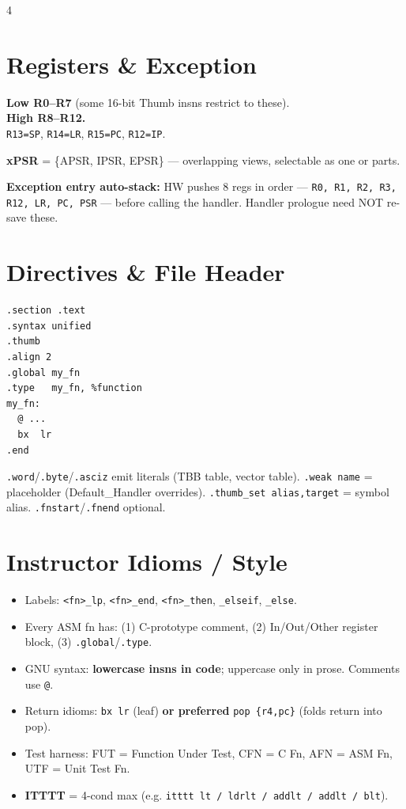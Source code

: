\documentclass[8pt,landscape]{extarticle}
\newcommand{\asm}[1]{\texttt{\scriptsize #1}}
\begin{document}
\begin{multicols*}{4}
\section{Registers \& Exception}

\textbf{Low R0--R7} (some 16-bit Thumb insns restrict to these).\\
\textbf{High R8--R12.}\\
\texttt{R13=SP}, \texttt{R14=LR}, \texttt{R15=PC}, \texttt{R12=IP}.

\textbf{xPSR} = \{APSR, IPSR, EPSR\} --- overlapping views, selectable as one or parts.

\textbf{Exception entry auto-stack:} HW pushes 8 regs in order --- \texttt{R0, R1, R2, R3, R12, LR, PC, PSR} --- before calling the handler. Handler prologue need NOT re-save these.

\section{Directives \& File Header}
\begin{lstlisting}
.section .text
.syntax unified
.thumb
.align 2
.global my_fn
.type   my_fn, %function
my_fn:
  @ ...
  bx  lr
.end
\end{lstlisting}
\texttt{.word}/\texttt{.byte}/\texttt{.asciz} emit literals (TBB table, vector table). \texttt{.weak name} = placeholder (Default\_Handler overrides). \texttt{.thumb\_set alias,target} = symbol alias. \texttt{.fnstart}/\texttt{.fnend} optional.

\section{Instructor Idioms / Style}
\begin{itemize}
\item Labels: \texttt{<fn>\_lp}, \texttt{<fn>\_end}, \texttt{<fn>\_then}, \texttt{\_elseif}, \texttt{\_else}.
\item Every ASM fn has: (1) C-prototype comment, (2) In/Out/Other register block, (3) \asm{.global}/\asm{.type}.
\item GNU syntax: \textbf{lowercase insns in code}; uppercase only in prose. Comments use \texttt{@}.
\item Return idioms: \asm{bx lr} (leaf) \textbf{or preferred} \asm{pop \{r4,pc\}} (folds return into pop).
\item Test harness: FUT = Function Under Test, CFN = C Fn, AFN = ASM Fn, UTF = Unit Test Fn.
\item \textbf{ITTTT} = 4-cond max (e.g. \asm{itttt lt / ldrlt / addlt / addlt / blt}).
\end{itemize}


\end{multicols*}
\end{document}
